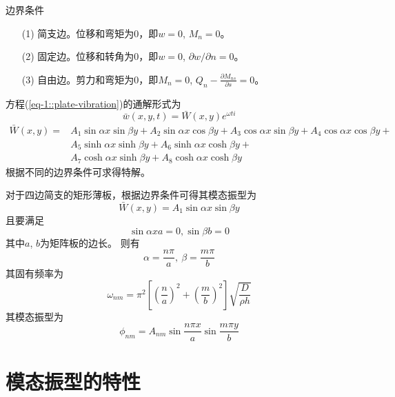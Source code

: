 \noindent 边界条件
\begin{enumerate}
    \item[(1)] 简支边。位移和弯矩为0，即$w=0$, $M_{n}=0$。
    \item[(2)] 固定边。位移和转角为0，即$w=0$, $\partial w/\partial n=0$。
    \item[(3)] 自由边。剪力和弯矩为0，即$M_{n}=0$, $Q_{n}-\frac{\partial M_{ns}}{\partial s}=0$。
\end{enumerate}

方程(\ref{eq-1::plate-vibration})的通解形式为
\begin{equation}
    \bar{w}(x,y,t)=\bar{W}(x,y)e^{\omega t i}
\end{equation}
\begin{equation}
    \begin{aligned}
        \bar{W}(x,y)=&A_{1}\sin\alpha x\sin\beta y + A_{2}\sin\alpha x\cos\beta y + 
        A_{3}\cos\alpha x\sin\beta y + A_{4}\cos\alpha x\cos\beta y + \\
        &A_{5}\sinh\alpha x\sinh\beta y + A_{6}\sinh\alpha x\cosh\beta y + \\
        &A_{7}\cosh\alpha x\sinh\beta y + A_{8}\cosh\alpha x\cosh\beta y
    \end{aligned}
\end{equation}
根据不同的边界条件可求得特解。

对于四边简支的矩形薄板，根据边界条件可得其模态振型为
\begin{equation}
    \bar{W}(x,y)=A_{1}\sin\alpha x\sin\beta y
\end{equation}
且要满足
\begin{equation}
    \sin \alpha xa=0, \sin \beta b=0
\end{equation}
其中$a$, $b$为矩阵板的边长。
则有
\begin{equation}
    \alpha=\frac{n\pi}{a},\ \beta=\frac{m\pi}{b}
\end{equation}
其固有频率为
\begin{equation}
    \omega_{nm}=\pi^{2}\left[\left(\frac{n}{a}\right)^{2}+\left(\frac{m}{b}\right)^{2}\right]\sqrt{\frac{D}{\rho h}}
\end{equation}
其模态振型为
\begin{equation}
    \phi_{nm}=A_{nm}\sin\frac{n\pi x}{a}\sin\frac{m\pi y}{b}
\end{equation}


\section{模态振型的特性}

